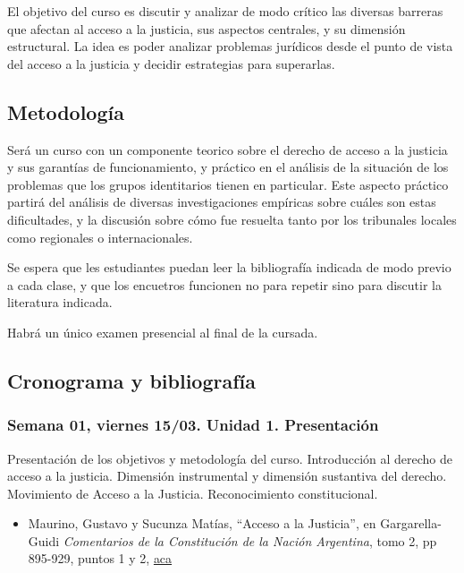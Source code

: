\documentclass[
]{article}
\providecommand{\tightlist}{%
  \setlength{\itemsep}{0pt}\setlength{\parskip}{0pt}}
\begin{document}
El objetivo del curso es discutir y analizar de modo crítico las
diversas barreras que afectan al acceso a la justicia, sus aspectos
centrales, y su dimensión estructural. La idea es poder analizar
problemas jurídicos desde el punto de vista del acceso a la justicia y
decidir estrategias para superarlas.

\hypertarget{metodologuxeda}{%
\subsection{Metodología}\label{metodologuxeda}}

Será un curso con un componente teorico sobre el derecho de acceso a la
justicia y sus garantías de funcionamiento, y práctico en el análisis de
la situación de los problemas que los grupos identitarios tienen en
particular. Este aspecto práctico partirá del análisis de diversas
investigaciones empíricas sobre cuáles son estas dificultades, y la
discusión sobre cómo fue resuelta tanto por los tribunales locales como
regionales o internacionales.

Se espera que les estudiantes puedan leer la bibliografía indicada de
modo previo a cada clase, y que los encuetros funcionen no para repetir
sino para discutir la literatura indicada.

Habrá un único examen presencial al final de la cursada.

\hypertarget{cronograma-y-bibliografuxeda}{%
\subsection{Cronograma y
bibliografía}\label{cronograma-y-bibliografuxeda}}

\hypertarget{semana-01-viernes-1503.-unidad-1.-presentaciuxf3n}{%
\subsubsection{Semana 01, viernes 15/03. Unidad 1.
Presentación}\label{semana-01-viernes-1503.-unidad-1.-presentaciuxf3n}}

Presentación de los objetivos y metodología del curso. Introducción al
derecho de acceso a la justicia. Dimensión instrumental y dimensión
sustantiva del derecho. Movimiento de Acceso a la Justicia.
Reconocimiento constitucional.

\begin{itemize}
\tightlist
\item
  Maurino, Gustavo y Sucunza Matías, ``Acceso a la Justicia'', en
  Gargarella- Guidi \emph{Comentarios de la Constitución de la Nación
  Argentina}, tomo 2, pp 895-929, puntos 1 y 2,
  \href{https://drive.google.com/file/d/1Gj7BF0AtPkcnPp7YI7-M2oU-olQHS_I9/view?usp=sharing}{aca}
\end{itemize}
\end{document}
